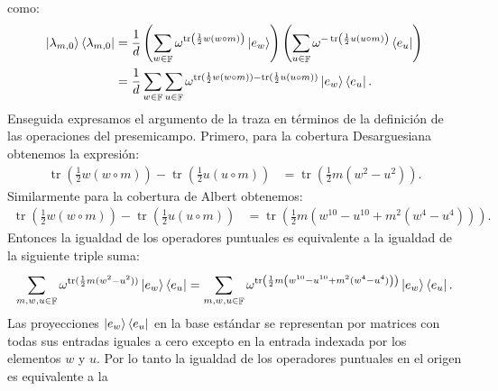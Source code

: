 \documentclass[a4paper,11pt]{report}
\DeclareMathOperator{\F}{\mathbb{F}}
\DeclareMathOperator{\tr}{tr}
\begin{document}
  como:
  \begin{align}
    \ket{\lambda_{m,0}} \bra{\lambda_{m,0}}
    &= \frac{1}{d} 
    \left(
      \sum_{w \in \F}^{} \omega^{\tr\left( \frac{1}{2}
      w(w\circ m) \right) }
      \ket{e_w}
    \right) 
    \left(
      \sum_{u \in \F}^{} \omega^{-\tr\left( \frac{1}{2}
      u(u \circ m) \right) }
      \bra{e_u}
    \right) \\
    &= \frac{1}{d}
    \sum_{w \in \F}^{} \sum_{u \in \F}^{} 
    \omega^{\tr( \frac{1}{2} w(w\circ m)) - \tr( \frac{1}{2}
    u(u \circ m))} 
    \ket{e_w} \bra{e_u}.
  \end{align}
  Enseguida expresamos el argumento de la traza en términos
  de la definición de las operaciones del presemicampo.
  Primero, para la cobertura Desarguesiana obtenemos la
  expresión:
  \begin{align}
    \tr\left(\frac{1}{2} w(w\circ m)\right)
    - \tr\left(\frac{1}{2} u(u\circ m)\right)
    &= \tr\left(\frac{1}{2} m \left( w^2-u^2 \right)\right).
  \end{align}
  Similarmente para la cobertura de Albert obtenemos:
  \begin{align}
    \tr\left(\frac{1}{2} w(w\circ m)\right)
    - \tr\left(\frac{1}{2} u(u\circ m)\right)
    &= \tr\left( 
      \frac{1}{2} m \left( w^{10} - u^{10}  
      + m^2 \left( w^{4} - u^{4}\right) \right)
    \right). 
  \end{align}
  Entonces la igualdad de los operadores puntuales es
  equivalente a la igualdad de la siguiente triple suma:
  \begin{equation}
    \sum_{m,w,u \in \F}^{}
    \omega^{\tr(\frac{1}{2} m(w^2-u^2))}
    \ket{e_w}\bra{e_u}
    = 
    \sum_{m,w,u \in \F}^{}
    \omega^{\tr\left(\frac{1}{2} m
    \left(w^{10}-u^{10} +  m^2(w^{4}-u^{4})\right) \right)
    }
    \ket{e_w}\bra{e_u}.
  \end{equation}
  Las proyecciones $\ket{e_w}\bra{e_u}$ en la base
  estándar se representan por matrices con todas sus
  entradas iguales a cero excepto en la entrada indexada por
  los elementos $w$ y $u$. Por lo tanto la igualdad de los
  operadores puntuales en el origen es equivalente a la
\end{document}
